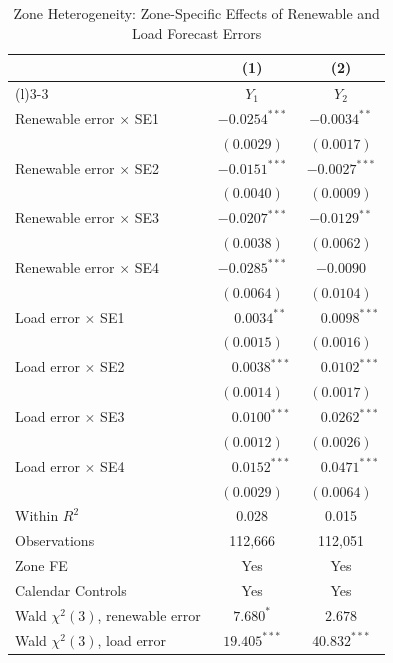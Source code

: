 \documentclass{article}
\begin{document}
\begin{table}[htbp]
\centering
\caption{Zone Heterogeneity: Zone-Specific Effects of Renewable and Load Forecast Errors}
\label{tab:r7_h3_loadzone}
\begin{threeparttable}
\begin{tabularx}{\linewidth}{>{\raggedright\arraybackslash}Xcc}
\toprule
 & (1) & (2) \\
\cmidrule(r){2-2}\cmidrule(l){3-3}
 & $Y_1$ & $Y_2$ \\
\midrule
Renewable error $\times$ SE1 & $-0.0254^{***}$ & $-0.0034^{**}$ \\
 & $(0.0029)$ & $(0.0017)$ \\[0.4ex]
Renewable error $\times$ SE2 & $-0.0151^{***}$ & $-0.0027^{***}$ \\
 & $(0.0040)$ & $(0.0009)$ \\[0.4ex]
Renewable error $\times$ SE3 & $-0.0207^{***}$ & $-0.0129^{**}$ \\
 & $(0.0038)$ & $(0.0062)$ \\[0.4ex]
Renewable error $\times$ SE4 & $-0.0285^{***}$ & $-0.0090$ \\
 & $(0.0064)$ & $(0.0104)$ \\[0.4ex]
Load error $\times$ SE1 & $\phantom{-}0.0034^{**}$ & $\phantom{-}0.0098^{***}$ \\
 & $(0.0015)$ & $(0.0016)$ \\[0.4ex]
Load error $\times$ SE2 & $\phantom{-}0.0038^{***}$ & $\phantom{-}0.0102^{***}$ \\
 & $(0.0014)$ & $(0.0017)$ \\[0.4ex]
Load error $\times$ SE3 & $\phantom{-}0.0100^{***}$ & $\phantom{-}0.0262^{***}$ \\
 & $(0.0012)$ & $(0.0026)$ \\[0.4ex]
Load error $\times$ SE4 & $\phantom{-}0.0152^{***}$ & $\phantom{-}0.0471^{***}$ \\
 & $(0.0029)$ & $(0.0064)$ \\
\midrule
Within $R^2$ & 0.028 & 0.015 \\
Observations & 112,666 & 112,051 \\
Zone FE & Yes & Yes \\
Calendar Controls & Yes & Yes \\
Wald $\chi^2(3)$, renewable error & $7.680^{*}$ & $2.678$ \\
Wald $\chi^2(3)$, load error & $19.405^{***}$ & $40.832^{***}$ \\
\bottomrule
\end{tabularx}

\end{threeparttable}
\end{table}
\end{document}
